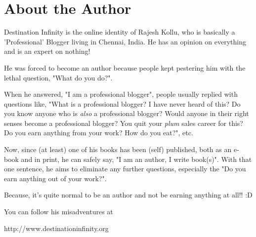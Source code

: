 \chapter{About the Author}

Destination Infinity is the online identity of Rajesh Kollu, who is basically a
'Professional' Blogger living in Chennai, India. He has an opinion on everything
and is an expert on nothing!

He was forced to become an author because people kept pestering him with the
lethal question, "What do you do?".

When he answered, "I am a professional blogger", people usually replied with
questions like, "What is a professional blogger? I have never heard of this? Do
you know anyone who is \emph{also} a professional blogger? Would anyone in their
right senses become a professional blogger? You quit your \emph{plum} sales
career for this? Do you earn anything from your work? How do you eat?", etc.

Now, since (at least) one of his books has been (self) published, both as an
e-book and in print, he can safely say, "I am an author, I write book(s)". With
that one sentence, he aims to eliminate any further questions, especially the
"Do you earn anything out of your work?".

Because, it's quite normal to be an author and not be earning anything at all!!
:D

You can follow his misadventures at

\vspace{1ex}

\centerline{http://www.destinationinfinity.org}
